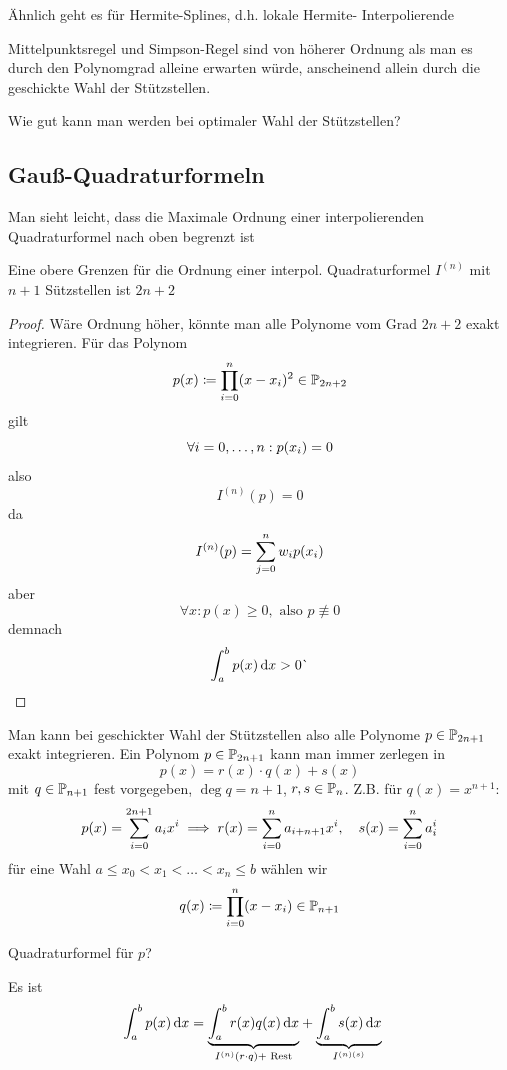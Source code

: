\documentclass[../Skript.tex]{subfiles}
\begin{document}
\begin{remark}
    Ähnlich geht es für Hermite-Splines, d.h. lokale Hermite-
    Interpolierende
\end{remark}
\begin{motivation}
    Mittelpunktsregel und Simpson-Regel sind von höherer Ordnung als 
    man es durch 
    den Polynomgrad alleine erwarten würde, anscheinend allein durch 
    die 
    geschickte Wahl der Stützstellen. 
\end{motivation}
\begin{question}
    Wie gut kann man werden bei optimaler Wahl der Stützstellen?
\end{question}
\subsection{Gauß-Quadraturformeln}
Man sieht leicht, dass die Maximale Ordnung einer interpolierenden 
Quadraturformel nach oben begrenzt ist
\begin{lemma}
    Eine obere Grenzen für die Ordnung einer interpol. Quadraturformel 
    $I^{(n)}$ 
    mit $n+1$ Sützstellen ist $2n+2$
\end{lemma}
\begin{proof}
    Wäre Ordnung höher, könnte man alle Polynome vom Grad $2n+2$ exakt 
    integrieren. Für das Polynom \[
        p(x) \coloneqq \prod_{i=0}^n(x-x_i)^2 \in \mathbb{P}_{2n+2}
    \]
    gilt \[
    \forall \igb i 0 n: p(x_i) = 0
    \]
    also \[
        I^{(n)}(p) = 0
    \]
    da \[
        I^{(n)}(p) = \displaystyle\sum_{j=0}^n w_ip(x_i)
    \]
    aber \[
    \forall x: p(x) \geq 0, \text{ also }p\not\equiv 0
    \]  
    demnach \[
        \int_a^b p(x)\mathop{}\!\mathrm{d} x > 0 \lightning
    \]    
\end{proof}
Man kann bei geschickter Wahl der Stützstellen also alle Polynome 
$p\in\mathbb{P}_{2n+1}$ exakt integrieren.
Ein Polynom $p\in\mathbb{P}_{2n+1}$ kann man immer zerlegen in \[
    p(x) = r(x) \cdot q(x) + s(x)\]
mit $q\in \mathbb{P}_{n+1}$ fest vorgegeben, $\deg{q} = n+1$, $r,s\in \mathbb{P}_n$.
Z.B. für $q(x) =x^{n+1}$: \[
    p(x) = \displaystyle\sum_{i=0}^{2n+1}a_ix^i \implies r(x) = \sum_{i=0}^n 
    a_{i+n+1}x^i, \hspace{1em} s(x) = \sum_{i=0}^na_i^i\]
für eine Wahl $a \leq x_0 < x_1 < \dots < x_n \leq b$ wählen wir \[
    q(x) \coloneqq \prod_{i=0}^n(x-x_i) \in \mathbb{P}_{n+1}\]
\begin{question}Quadraturformel für $p$?
\end{question}
Es ist \begin{align*}
    \int_a^b p(x) \mathop{}\!\mathrm{d} x &= \underset{I^{(n)}(r\cdot q) + \text{ Rest}}
    {\underbrace{\int_a^b r(x) q(x) \mathop{}\!\mathrm{d} x}} + \underset{I^{(n)
    (s)}}{\underbrace{\int_a^b s(x)\mathop{}\!\mathrm{d} x}}
\end{align*}
\end{document}
